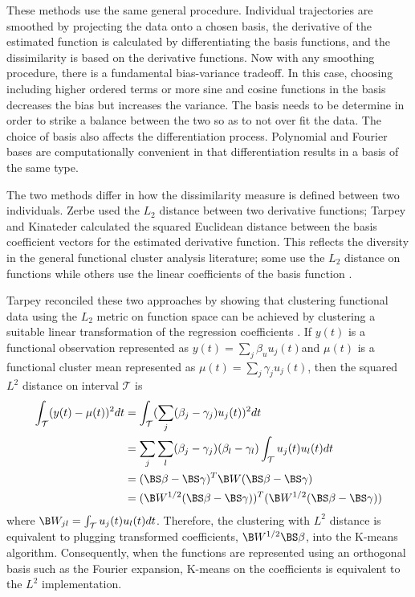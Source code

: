 These methods use the same general procedure. Individual trajectories are smoothed by projecting the data onto a chosen basis, the derivative of the estimated function is calculated by differentiating the basis functions, and the dissimilarity is based on the derivative functions. Now with any smoothing procedure, there is a fundamental bias-variance tradeoff. In this case, choosing including higher ordered terms or more sine and cosine functions in the basis decreases the bias but increases the variance. The basis needs to be determine in order to strike a balance between the two so as to not over fit the data. The choice of basis also affects the differentiation process. Polynomial and Fourier bases are computationally convenient in that differentiation results in a basis of the same type.

 The two methods differ in how the dissimilarity measure is defined between two individuals. Zerbe used the $L_{2}$ distance between two derivative functions; Tarpey and Kinateder calculated the squared Euclidean distance between the basis coefficient vectors for the estimated derivative function. This reflects the diversity in the general functional cluster analysis literature; some use the $L_{2}$ distance on functions \cite{hitchcock2007} while others use the linear coefficients of the basis function \cite{serban2005, tarpey2003, abraham2003}.
 
Tarpey reconciled these two approaches by showing that clustering functional data using the $L_{2}$ metric on function space can be achieved by clustering a suitable linear transformation of the regression coefficients \cite{tarpey2007}. If $y(t)$ is a functional observation represented as $y(t)=\sum_{j}\beta_{u}u_{j}(t)$and $\mu(t)$ is a functional cluster mean represented as $\mu(t) = \sum_{j}\gamma_{j}u_{j}(t)$, then the squared $L^{2}$ distance on interval $\mathcal{T}$ is
\begin{align*}
\int_{\mathcal{T}}(y(t)-\mu(t))^{2}dt &= \int_{\mathcal{T}}(\sum_{j}(\beta_{j}-\gamma_{j})u_{j}(t))^{2}dt\\
&= \sum_{j}\sum_{l}(\beta_{j}-\gamma_{j})(\beta_{l}-\gamma_{l}) \int_{\mathcal{T}}u_{j}(t)u_{l}(t)dt\\
&=(\BS\beta-\BS\gamma)^{T}\B W (\BS\beta-\BS\gamma)\\
&=(\B W^{1/2}(\BS\beta-\BS\gamma))^{T} (\B W^{1/2}(\BS\beta-\BS\gamma))
\end{align*}
where $\B W_{jl} = \int_{\mathcal{T}}u_{j}(t)u_{l}(t)dt$. Therefore, the clustering with $L^{2}$ distance is equivalent to plugging transformed coefficients, $\B W^{1/2}\BS\beta$, into the K-means algorithm. Consequently, when the functions are represented using an orthogonal basis such as the Fourier expansion, K-means on the coefficients is equivalent to the $L^{2}$ implementation.\\

